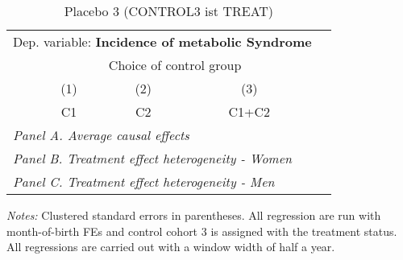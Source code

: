  \begin{table}[H] \centering \begin{threeparttable} \caption{Placebo 3 (CONTROL3 ist TREAT) } {\def\sym#1{\ifmmode^{#1}\else\(^{#1}\)\fi} \begin{tabular}{l*{4}{c}} \toprule \multicolumn{4}{l}{Dep. variable: \textbf{Incidence of metabolic Syndrome}} \\ & \multicolumn{3}{c}{Choice of control group} \\ \cmidrule(lr){2-4}
            &\multicolumn{1}{c}{(1)}&\multicolumn{1}{c}{(2)}&\multicolumn{1}{c}{(3)}\\
            &\multicolumn{1}{c}{C1}&\multicolumn{1}{c}{C2}&\multicolumn{1}{c}{C1+C2}\\
\midrule
 \multicolumn{4}{l}{\emph{Panel A. Average causal effects}} \\      \midrule\multicolumn{4}{l}{\emph{Panel B. Treatment effect heterogeneity - Women}} \\      \midrule\multicolumn{4}{l}{\emph{Panel C. Treatment effect heterogeneity - Men}} \\      
\bottomrule \end{tabular} } \begin{tablenotes} \item \scriptsize \emph{Notes:} Clustered standard errors in parentheses. All regression are run with month-of-birth FEs and control cohort 3 is assigned with the treatment status. All regressions are carried out with a window width of half a year. \end{tablenotes} \end{threeparttable} \end{table} 
